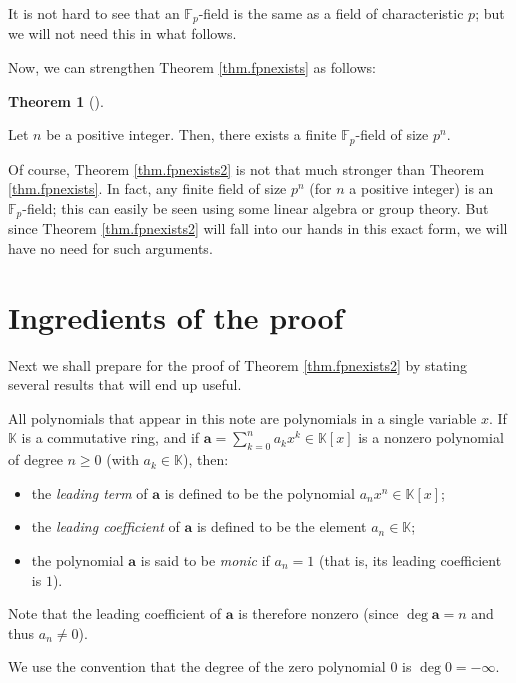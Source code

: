 \documentclass[numbers=enddot,12pt,final,onecolumn,notitlepage]{scrartcl}%
\theoremstyle{definition}
\newtheorem{theo}{Theorem}[subsection]
\newenvironment{theorem}[1][]
{\begin{theo}[#1]\begin{leftbar}}
{\end{leftbar}\end{theo}}
\let\sumnonlimits\sum
\renewcommand{\sum}{\sumnonlimits\limits}
\begin{document}
It is not hard to see that an $\mathbb{F}_{p}$-field is the same as a field of
characteristic $p$; but we will not need this in what follows.

Now, we can strengthen Theorem \ref{thm.fpnexists} as follows:

\begin{theorem}
\label{thm.fpnexists2}Let $n$ be a positive integer. Then, there exists a
finite $\mathbb{F}_{p}$-field of size $p^{n}$.
\end{theorem}

Of course, Theorem \ref{thm.fpnexists2} is not that much stronger than Theorem
\ref{thm.fpnexists}. In fact, any finite field of size $p^{n}$ (for $n$ a
positive integer) is an $\mathbb{F}_{p}$-field; this can easily be seen using
some linear algebra or group theory. But since Theorem \ref{thm.fpnexists2}
will fall into our hands in this exact form, we will have no need for such arguments.

\section{Ingredients of the proof}

Next we shall prepare for the proof of Theorem \ref{thm.fpnexists2} by stating
several results that will end up useful.

All polynomials that appear in this note are polynomials in a single variable
$x$. If $\mathbb{K}$ is a commutative ring, and if $\mathbf{a}=\sum_{k=0}%
^{n}a_{k}x^{k}\in\mathbb{K}\left[  x\right]  $ is a nonzero polynomial of
degree $n\geq0$ (with $a_{k}\in\mathbb{K}$), then:

\begin{itemize}
\item the \textit{leading term} of $\mathbf{a}$ is defined to be the
polynomial $a_{n}x^{n}\in\mathbb{K}\left[  x\right]  $;

\item the \textit{leading coefficient} of $\mathbf{a}$ is defined to be the
element $a_{n}\in\mathbb{K}$;

\item the polynomial $\mathbf{a}$ is said to be \textit{monic} if $a_{n}=1$
(that is, its leading coefficient is $1$).
\end{itemize}

\noindent Note that the leading coefficient of $\mathbf{a}$ is therefore
nonzero (since $\deg\mathbf{a}=n$ and thus $a_{n}\neq0$).

We use the convention that the degree of the zero polynomial $0$ is
$\deg0=-\infty$.
\end{document}
